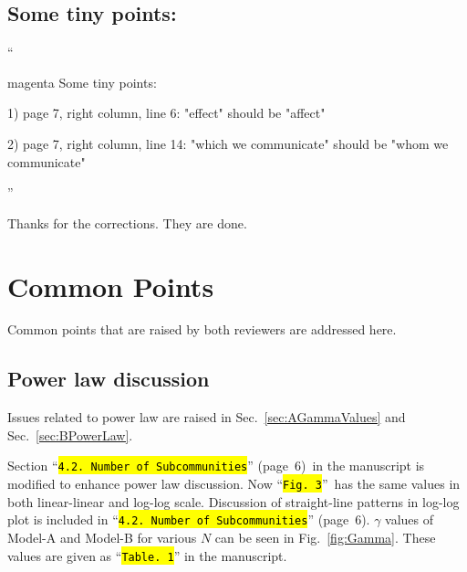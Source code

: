 \documentclass[10.5pt]{amsart}
\newcommand{\reffig}[1]{Fig.~\ref{#1}}
\newcommand{\refsec}[1]{Sec.~\ref{#1}}
\newcommand{\hbColorReviewer}{magenta}
\newcommand{\hbColorManuscript}{violet}
\newenvironment{hbReviewer}
	{\list{}{\leftmargin=2cm\rightmargin=1cm}\item[]``\begin{footnotesize}
	\begin{color}{\hbColorReviewer}}	
	{\end{color}\end{footnotesize}''\endlist}
\newcommand{\hbMRef}[1]{``\texttt{{\color{\hbColorManuscript}\hl{#1}}}''}
\newcommand{\hbMRefP}[2]{``\texttt{{\color{\hbColorManuscript}\hl{#1}}}''  (page~#2)}
\newcommand{\hbMreffig}[1]{\hbMRef{Fig.~#1}}
\newcommand{\hbMreftbl}[1]{\hbMRef{Table.~#1}}
\newcommand{\hbMNumberOfSubcommunities}{\hbMRefP{4.2. Number of Subcommunities}{6}}
\begin{document}
\subsection{Some tiny points:}
\begin{hbReviewer}
Some tiny points:

1) page 7, right column, line 6: "effect" should be "affect"

2) page 7, right column, line 14: "which we communicate" should be "whom we communicate"
\end{hbReviewer}

Thanks for the corrections. They are done.




\section{Common Points}
	\label{sec:CommonPoints}


Common points that are raised by both reviewers are addressed here. 




\subsection{Power law discussion}
\label{sec:R2PowerLaw}

Issues related to power law are raised in 
\refsec{sec:AGammaValues} 
and 
\refsec{sec:BPowerLaw}. 

Section \hbMNumberOfSubcommunities\ in the manuscript is modified to enhance power law discussion. 
Now \hbMreffig{3}\ has the same values in both linear-linear and log-log scale.
Discussion of straight-line patterns in log-log plot is included 
in \hbMNumberOfSubcommunities.
$\gamma$ values of Model-A and Model-B for various $N$ 
can be seen in \reffig{fig:Gamma}.
These values are given as \hbMreftbl{1} in the manuscript.
\end{document}
